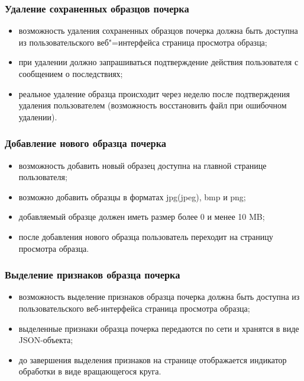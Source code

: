 \subsubsection{Удаление сохраненных образцов почерка}
\label{sec:freq:delete}
\begin{itemize}
	\item возможность удаления сохраненных образцов почерка должна быть доступна из пользовательского веб"=интерфейса страница просмотра образца;
	\item при удалении должно запрашиваться подтверждение действия пользователя с сообщением о последствиях;
	\item реальное удаление образца происходит через неделю после подтверждения удаления пользователем (возможность восстановить файл при ошибочном удалении).
\end{itemize}

\subsubsection{Добавление нового образца почерка}
\label{sec:freq:add}
\begin{itemize}
	\item возможность добавить новый образец доступна на главной странице пользователя;
	\item возможно добавить образцы в форматах jpg(jpeg), bmp и png;
	\item добавляемый образце должен иметь размер более 0 и менее 10 MB;
	\item после добавления нового образца пользователь переходит на страницу просмотра образца.
\end{itemize}

\subsubsection{Выделение признаков образца почерка}
\label{sec:freq:extract_features}
\begin{itemize}
	\item возможность выделение признаков образца почерка должна быть доступна из пользовательского веб-интерфейса страница просмотра образца;
	\item выделенные признаки образца почерка передаются по сети и хранятся в виде JSON-объекта;
	\item до завершения выделения признаков на странице отображается индикатор обработки в виде вращающегося круга.
\end{itemize}

